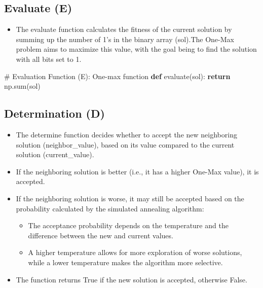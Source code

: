 \documentclass[
  letterpaper,
  DIV=11,
  numbers=noendperiod]{scrreprt}
\newenvironment{Shaded}{\begin{snugshade}}{\end{snugshade}}
\newcommand{\BuiltInTok}[1]{\textcolor[rgb]{0.00,0.23,0.31}{#1}}
\newcommand{\CommentTok}[1]{\textcolor[rgb]{0.37,0.37,0.37}{#1}}
\newcommand{\ControlFlowTok}[1]{\textcolor[rgb]{0.00,0.23,0.31}{\textbf{#1}}}
\newcommand{\KeywordTok}[1]{\textcolor[rgb]{0.00,0.23,0.31}{\textbf{#1}}}
\newcommand{\NormalTok}[1]{\textcolor[rgb]{0.00,0.23,0.31}{#1}}
\providecommand{\tightlist}{%
  \setlength{\itemsep}{0pt}\setlength{\parskip}{0pt}}\usepackage{longtable,booktabs,array}
\begin{document}
\subsection{Evaluate (E)}\label{evaluate-e}

\begin{itemize}
\tightlist
\item
  The evaluate function calculates the fitness of the current solution
  by summing up the number of 1's in the binary array (sol).The One-Max
  problem aims to maximize this value, with the goal being to find the
  solution with all bits set to 1.
\end{itemize}

\begin{Shaded}
\begin{Highlighting}[]
\CommentTok{\# Evaluation Function (E): One{-}max function}
\KeywordTok{def}\NormalTok{ evaluate(sol):}
    \ControlFlowTok{return}\NormalTok{ np.}\BuiltInTok{sum}\NormalTok{(sol)}
\end{Highlighting}
\end{Shaded}

\subsection{Determination (D)}\label{determination-d}

\begin{itemize}
\tightlist
\item
  The determine function decides whether to accept the new neighboring
  solution (neighbor\_value), based on its value compared to the current
  solution (current\_value).
\item
  If the neighboring solution is better (i.e., it has a higher One-Max
  value), it is accepted.
\item
  If the neighboring solution is worse, it may still be accepted based
  on the probability calculated by the simulated annealing algorithm:

  \begin{itemize}
  \tightlist
  \item
    The acceptance probability depends on the temperature and the
    difference between the new and current values.
  \item
    A higher temperature allows for more exploration of worse solutions,
    while a lower temperature makes the algorithm more selective.
  \end{itemize}
\item
  The function returns True if the new solution is accepted, otherwise
  False.
\end{itemize}
\end{document}

